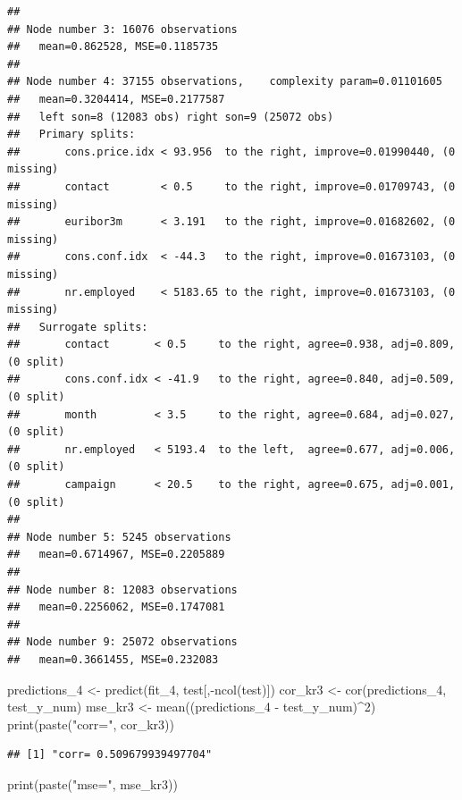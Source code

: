 \documentclass[
]{article}
\newenvironment{Shaded}{\begin{snugshade}}{\end{snugshade}}
\newcommand{\DecValTok}[1]{\textcolor[rgb]{0.00,0.00,0.81}{#1}}
\newcommand{\FunctionTok}[1]{\textcolor[rgb]{0.00,0.00,0.00}{#1}}
\newcommand{\NormalTok}[1]{#1}
\newcommand{\OtherTok}[1]{\textcolor[rgb]{0.56,0.35,0.01}{#1}}
\newcommand{\SpecialCharTok}[1]{\textcolor[rgb]{0.00,0.00,0.00}{#1}}
\newcommand{\StringTok}[1]{\textcolor[rgb]{0.31,0.60,0.02}{#1}}
\begin{document}
\begin{verbatim}
## 
## Node number 3: 16076 observations
##   mean=0.862528, MSE=0.1185735 
## 
## Node number 4: 37155 observations,    complexity param=0.01101605
##   mean=0.3204414, MSE=0.2177587 
##   left son=8 (12083 obs) right son=9 (25072 obs)
##   Primary splits:
##       cons.price.idx < 93.956  to the right, improve=0.01990440, (0 missing)
##       contact        < 0.5     to the right, improve=0.01709743, (0 missing)
##       euribor3m      < 3.191   to the right, improve=0.01682602, (0 missing)
##       cons.conf.idx  < -44.3   to the right, improve=0.01673103, (0 missing)
##       nr.employed    < 5183.65 to the right, improve=0.01673103, (0 missing)
##   Surrogate splits:
##       contact       < 0.5     to the right, agree=0.938, adj=0.809, (0 split)
##       cons.conf.idx < -41.9   to the right, agree=0.840, adj=0.509, (0 split)
##       month         < 3.5     to the right, agree=0.684, adj=0.027, (0 split)
##       nr.employed   < 5193.4  to the left,  agree=0.677, adj=0.006, (0 split)
##       campaign      < 20.5    to the right, agree=0.675, adj=0.001, (0 split)
## 
## Node number 5: 5245 observations
##   mean=0.6714967, MSE=0.2205889 
## 
## Node number 8: 12083 observations
##   mean=0.2256062, MSE=0.1747081 
## 
## Node number 9: 25072 observations
##   mean=0.3661455, MSE=0.232083
\end{verbatim}

\begin{Shaded}
\begin{Highlighting}[]
\NormalTok{predictions\_4 }\OtherTok{\textless{}{-}} \FunctionTok{predict}\NormalTok{(fit\_4, test[,}\SpecialCharTok{{-}}\FunctionTok{ncol}\NormalTok{(test)])}
\NormalTok{cor\_kr3 }\OtherTok{\textless{}{-}} \FunctionTok{cor}\NormalTok{(predictions\_4, test\_y\_num)}
\NormalTok{mse\_kr3 }\OtherTok{\textless{}{-}} \FunctionTok{mean}\NormalTok{((predictions\_4 }\SpecialCharTok{{-}}\NormalTok{ test\_y\_num)}\SpecialCharTok{\^{}}\DecValTok{2}\NormalTok{)}
\FunctionTok{print}\NormalTok{(}\FunctionTok{paste}\NormalTok{(}\StringTok{"corr="}\NormalTok{, cor\_kr3))}
\end{Highlighting}
\end{Shaded}

\begin{verbatim}
## [1] "corr= 0.509679939497704"
\end{verbatim}

\begin{Shaded}
\begin{Highlighting}[]
\FunctionTok{print}\NormalTok{(}\FunctionTok{paste}\NormalTok{(}\StringTok{"mse="}\NormalTok{, mse\_kr3))}
\end{Highlighting}
\end{Shaded}
\end{document}

